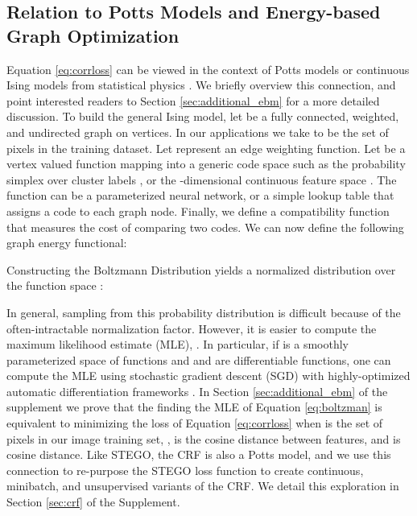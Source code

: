 \documentclass{article} \usepackage{iclr2022_conference,times}
\newcommand{\R}{\mathbb{R}}
\begin{document}
\subsection{Relation to Potts Models and Energy-based Graph Optimization}
\label{sec:ebm}
\renewcommand{\R}{\mathbb{R}}
\newcommand{\G}{\mathcal{G}}
\newcommand{\V}{\mathcal{V}}
\newcommand{\C}{\mathcal{C}}
\newcommand{\F}{\mathcal{F}}
\renewcommand{\P}{\mathbb{P}}

Equation \ref{eq:corrloss} can be viewed in the context of Potts models or continuous Ising models from statistical physics \citep{potts1952some,baker1979continuous}. We briefly overview this connection, and point interested readers to Section \ref{sec:additional_ebm} for a more detailed discussion. To build the general Ising model, let  be a fully connected, weighted, and undirected graph on  vertices. In our applications we take  to be the set of pixels in the training dataset. Let  represent an edge weighting function. Let  be a vertex valued function mapping into a generic code space  such as the probability simplex over cluster labels , or the -dimensional continuous feature space . The function  can be a parameterized neural network, or a simple lookup table that assigns a code to each graph node. Finally, we define a compatibility function  that measures the cost of comparing two codes. We can now define the following graph energy functional:

Constructing the Boltzmann Distribution \citep{hinton2002training} yields a normalized distribution over the function space :

In general, sampling from this probability distribution is difficult because of the often-intractable normalization factor. However, it is easier to compute the maximum likelihood estimate (MLE),
. In particular, if  is a smoothly parameterized space of functions and  and  are differentiable functions, one can compute the MLE using stochastic gradient descent (SGD) with highly-optimized automatic differentiation frameworks \citep{pytorch,tensorflow}. In Section \ref{sec:additional_ebm} of the supplement we prove that the finding the MLE of Equation \ref{eq:boltzman} is equivalent to minimizing the loss of Equation \ref{eq:corrloss} when  is the set of pixels in our image training set, ,  is the cosine distance between features, and  is cosine distance. Like STEGO, the CRF is also a Potts model, and we use this connection to re-purpose the STEGO loss function to create continuous, minibatch, and unsupervised variants of the CRF. We detail this exploration in Section \ref{sec:crf} of the Supplement. 
\end{document}

